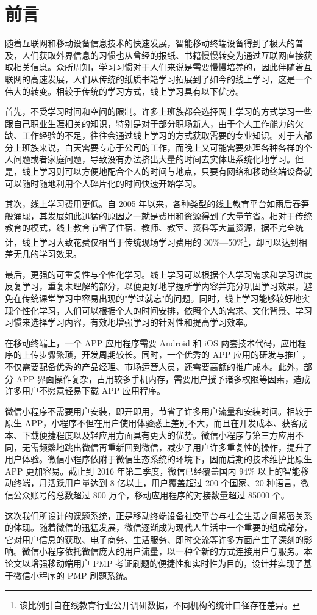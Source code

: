 \section{前言}

随着互联网和移动设备信息技术的快速发展，智能移动终端设备得到了极大的普及，人们获取外界信息的习惯也从曾经的报纸、书籍慢慢转变为通过互联网直接获取相关信息。众所周知，学习习惯对于人们来说是需要慢慢培养的，因此伴随着互联网的高速发展，人们从传统的纸质书籍学习拓展到了如今的线上学习，这是一个伟大的转变。相较于传统的学习方式，线上学习具有以下优势。

首先，不受学习时间和空间的限制。许多上班族都会选择网上学习的方式学习一些跟自己职业生涯相关的知识，特别是对于部分职场新人，由于个人工作能力的欠缺、工作经验的不足，往往会通过线上学习的方式获取需要的专业知识。对于大部分上班族来说，白天需要专心于公司的工作，而晚上又可能需要处理各种各样的个人问题或者家庭问题，导致没有办法挤出大量的时间去实体班系统化地学习。但是，线上学习则可以方便地配合个人的时间与地点，只要有网络和移动终端设备就可以随时随地利用个人碎片化的时间快速开始学习。

其次，线上学习费用更低。自 2005 年以来，各种类型的线上教育平台如雨后春笋般涌现，其发展如此迅猛的原因之一就是费用和资源得到了大量节省。相对于传统教育的模式，线上教育节省了住宿、教师、教室、资料等大量资源，据不完全统计，线上学习大致花费仅相当于传统现场学习费用的 30\%---50\%\footnote{该比例引自在线教育行业公开调研数据，不同机构的统计口径存在差异。}，却可以达到相差无几的学习效果\cite{bib:moodle}。

最后，更强的可重复性与个性化学习。线上学习可以根据个人学习需求和学习进度反复学习，重复未理解的部分，以便更好地掌握所学内容并充分巩固学习效果，避免在传统课堂学习中容易出现的"学过就忘"的问题。同时，线上学习能够较好地实现个性化学习，人们可以根据个人的时间安排，依照个人的需求、文化背景、学习习惯来选择学习内容，有效地增强学习的针对性和提高学习效率。

在移动终端上，一个 APP 应用程序需要 Android 和 iOS 两套技术代码，应用程序的上传步骤繁琐，开发周期较长。同时，一个优秀的 APP 应用的研发与推广，不仅需要配备优秀的产品经理、市场运营人员，还需要高额的推广成本。此外，部分 APP 界面操作复杂，占用较多手机内存，需要用户授予诸多权限等因素，造成许多用户不愿意轻易下载 APP 应用程序。

微信小程序不需要用户安装，即开即用，节省了许多用户流量和安装时间。相较于原生 APP，小程序不但在用户使用体验感上差别不大，而且在开发成本、获客成本、下载便捷程度以及轻应用方面具有更大的优势。微信小程序与第三方应用不同，无需频繁地跳出微信再重新回到微信，减少了用户许多重复性的操作，提升了用户体验。微信小程序依附于微信生态系统的环境下，因而后期的技术维护比原生 APP 更加容易。截止到 2016 年第二季度，微信已经覆盖国内 94\% 以上的智能移动终端，月活跃用户量达到 8 亿以上，用户覆盖超过 200 个国家、20 种语言，微信公众账号的总数超过 800 万个，移动应用程序的对接数量超过 85000 个\cite{bib:xiong}。

这次我们所设计的课题系统，正是移动终端设备社交平台与社会生活之间紧密关系的体现。随着微信的迅猛发展，微信逐渐成为现代人生活中一个重要的组成部分，它对用户信息的获取、电子商务、生活服务、即时交流等许多方面产生了深刻的影响。微信小程序依托微信庞大的用户流量，以一种全新的方式连接用户与服务。本论文以增强移动端用户 PMP 考证刷题的便捷性和实时性为目的，设计并实现了基于微信小程序的 PMP 刷题系统。
